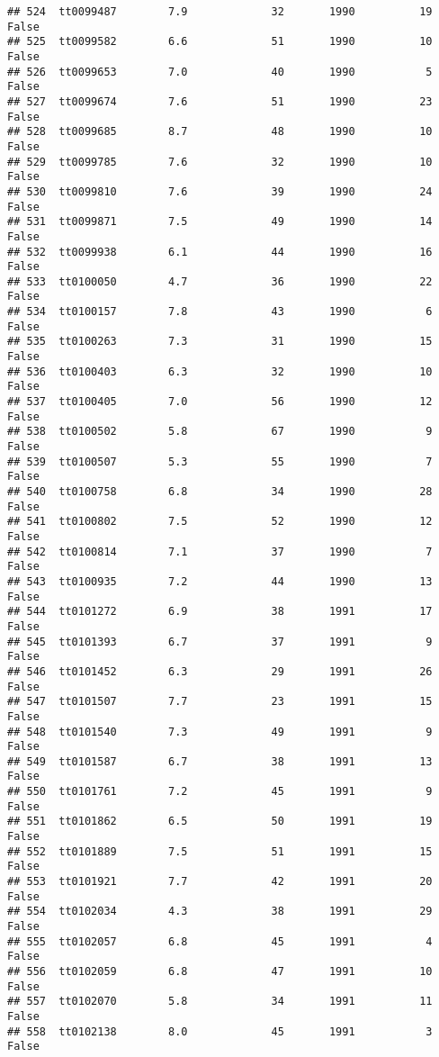 \documentclass[
]{article}
\begin{document}
\begin{verbatim}
## 524  tt0099487        7.9             32       1990          19   False
## 525  tt0099582        6.6             51       1990          10   False
## 526  tt0099653        7.0             40       1990           5   False
## 527  tt0099674        7.6             51       1990          23   False
## 528  tt0099685        8.7             48       1990          10   False
## 529  tt0099785        7.6             32       1990          10   False
## 530  tt0099810        7.6             39       1990          24   False
## 531  tt0099871        7.5             49       1990          14   False
## 532  tt0099938        6.1             44       1990          16   False
## 533  tt0100050        4.7             36       1990          22   False
## 534  tt0100157        7.8             43       1990           6   False
## 535  tt0100263        7.3             31       1990          15   False
## 536  tt0100403        6.3             32       1990          10   False
## 537  tt0100405        7.0             56       1990          12   False
## 538  tt0100502        5.8             67       1990           9   False
## 539  tt0100507        5.3             55       1990           7   False
## 540  tt0100758        6.8             34       1990          28   False
## 541  tt0100802        7.5             52       1990          12   False
## 542  tt0100814        7.1             37       1990           7   False
## 543  tt0100935        7.2             44       1990          13   False
## 544  tt0101272        6.9             38       1991          17   False
## 545  tt0101393        6.7             37       1991           9   False
## 546  tt0101452        6.3             29       1991          26   False
## 547  tt0101507        7.7             23       1991          15   False
## 548  tt0101540        7.3             49       1991           9   False
## 549  tt0101587        6.7             38       1991          13   False
## 550  tt0101761        7.2             45       1991           9   False
## 551  tt0101862        6.5             50       1991          19   False
## 552  tt0101889        7.5             51       1991          15   False
## 553  tt0101921        7.7             42       1991          20   False
## 554  tt0102034        4.3             38       1991          29   False
## 555  tt0102057        6.8             45       1991           4   False
## 556  tt0102059        6.8             47       1991          10   False
## 557  tt0102070        5.8             34       1991          11   False
## 558  tt0102138        8.0             45       1991           3   False

\end{verbatim}
\end{document}
